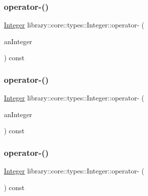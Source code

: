 \subsubsection{\texorpdfstring{operator-\/()}{operator-()}\hspace{0.1cm}{\footnotesize\ttfamily [1/3]}}
{\footnotesize\ttfamily \hyperlink{classlibrary_1_1core_1_1types_1_1Integer}{Integer} library\+::core\+::types\+::\+Integer\+::operator-\/ (\begin{DoxyParamCaption}\item[{const \hyperlink{classlibrary_1_1core_1_1types_1_1Integer}{Integer} \&}]{an\+Integer }\end{DoxyParamCaption}) const}

\mbox{\label{classlibrary_1_1core_1_1types_1_1Integer_a7bbe7f9e02df0f4d64df023552c109e2}} 
\subsubsection{\texorpdfstring{operator-\/()}{operator-()}\hspace{0.1cm}{\footnotesize\ttfamily [2/3]}}
{\footnotesize\ttfamily \hyperlink{classlibrary_1_1core_1_1types_1_1Integer}{Integer} library\+::core\+::types\+::\+Integer\+::operator-\/ (\begin{DoxyParamCaption}\item[{const \hyperlink{classlibrary_1_1core_1_1types_1_1Integer_a623afb1580f870fd8a1997b1c12c917d}{Integer\+::\+Value\+Type} \&}]{an\+Integer }\end{DoxyParamCaption}) const}

\mbox{\label{classlibrary_1_1core_1_1types_1_1Integer_ad9670b50ae46bc0f09e4995e445dab99}} 
\subsubsection{\texorpdfstring{operator-\/()}{operator-()}\hspace{0.1cm}{\footnotesize\ttfamily [3/3]}}
{\footnotesize\ttfamily \hyperlink{classlibrary_1_1core_1_1types_1_1Integer}{Integer} library\+::core\+::types\+::\+Integer\+::operator-\/ (\begin{DoxyParamCaption}{ }\end{DoxyParamCaption}) const}

